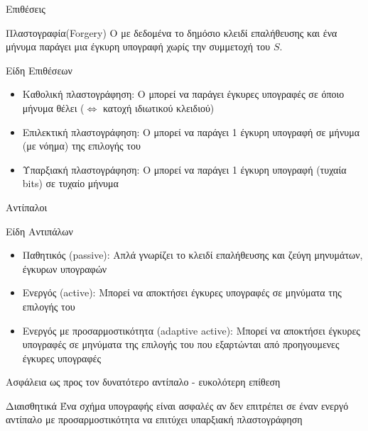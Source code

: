 \documentclass[handout]{beamer}
\begin{document}
\begin{frame}{Επιθέσεις}
\begin{block}{Πλαστογραφία(Forgery)}
O \adv με δεδομένα το δημόσιο κλειδί επαλήθευσης και ένα μήνυμα παράγει μια έγκυρη υπογραφή χωρίς την συμμετοχή του $S$. 
\end{block}
\pause
\begin{block}{\alert{Είδη Επιθέσεων}}
\begin{itemize}
\item \alert{Καθολική πλαστογράφηση}: Ο \adv μπορεί να παράγει έγκυρες υπογραφές σε όποιο μήνυμα θέλει ($\Leftrightarrow$ κατοχή ιδιωτικού κλειδιού)
\pause
\item \alert{Επιλεκτική πλαστογράφηση}: Ο \adv μπορεί να παράγει 1 έγκυρη υπογραφή σε μήνυμα (με νόημα) της επιλογής του   
\pause
\item \alert{Υπαρξιακή πλαστογράφηση}: Ο \adv μπορεί να παράγει 1 έγκυρη υπογραφή (τυχαία bits) σε τυχαίο μήνυμα
\end{itemize}
\end{block}
\end{frame}

\begin{frame}[allowframebreaks]{Αντίπαλοι}
\begin{block}{Είδη Αντιπάλων}
\begin{itemize}
\item Παθητικός (passive): Απλά γνωρίζει το κλειδί επαλήθευσης και ζεύγη μηνυμάτων, έγκυρων υπογραφών
\item Ενεργός (active): Μπορεί να αποκτήσει έγκυρες υπογραφές σε μηνύματα της επιλογής του
\item Ενεργός με προσαρμοστικότητα (adaptive active): Μπορεί να αποκτήσει έγκυρες υπογραφές σε μηνύματα της επιλογής του που εξαρτώνται από προηγουμενες έγκυρες υπογραφές
\end{itemize}
\end{block}
\framebreak
Ασφάλεια ως προς τον δυνατότερο αντίπαλο - ευκολότερη επίθεση

\begin{block}{Διαισθητικά}
Ένα σχήμα υπογραφής είναι ασφαλές αν δεν επιτρέπει σε έναν ενεργό αντίπαλο με προσαρμοστικότητα να επιτύχει υπαρξιακή πλαστογράφηση 
\end{block}
\end{frame}
\end{document}
